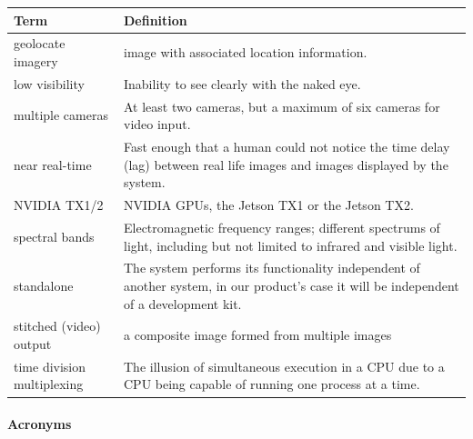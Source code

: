 \documentclass[letterpaper,10pt,serif,draftclsnofoot,onecolumn,compsoc,titlepage]{IEEEtran}
\begin{document}
\begin{tabular}{|l|p{11cm}|}
	\hline
	\textbf{Term} & \textbf{Definition}\\
	\hline
	geolocate imagery & image with associated location information.\\
	\hline
	low visibility & Inability to see clearly with the naked eye.\\
	\hline	
	multiple cameras & At least two cameras, but a maximum of six cameras for 
	video input.\\
	\hline
	near real-time & Fast enough that a human could not notice the time 
	delay (lag) between \newline real life images and images displayed by the system.\\
	\hline
	NVIDIA TX1/2 & NVIDIA GPUs, the Jetson TX1 or the Jetson TX2.\\
	\hline
	spectral bands & Electromagnetic frequency ranges; different 
	spectrums of light, including \newline but not limited to infrared 
	and visible light.\\
	\hline
	standalone & The system performs its functionality independent of another
	system, in our product's case it will be independent of a development kit. \\
	\hline
	stitched (video) output & a composite image formed from multiple images\\
	\hline
	time division multiplexing & The illusion of simultaneous execution in a CPU due
	to a CPU being capable of running one process at a time.\\
	\hline
\end{tabular}

\paragraph{Acronyms}
\end{document}
